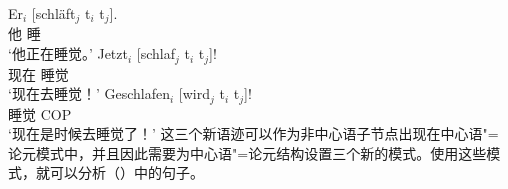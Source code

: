 \eal\settowidth{}
\ex 
\gll Er$_i$    [schläft$_j$ t$_i$ t$_j$].\\
	 他 \spacebr{}睡\\  
\glt `他正在睡觉。'
\ex 
\gll Jetzt$_i$ [schlaf$_j$ t$_i$ t$_j$]!\\
	 现在 \spacebr{}睡觉\\   
\glt `现在去睡觉！'
\ex 
\gll Geschlafen$_i$ [wird$_j$ t$_i$ t$_j$]! \\
	 睡觉 \spacebr{}COP\\
\glt `现在是时候去睡觉了！'
\zl
这三个新语迹可以作为非中心语子节点出现在中心语"=论元模式中，并且因此需要为中心语"=论元结构设置三个新的模式。使用这些模式，就可以分析（）中的句子。

